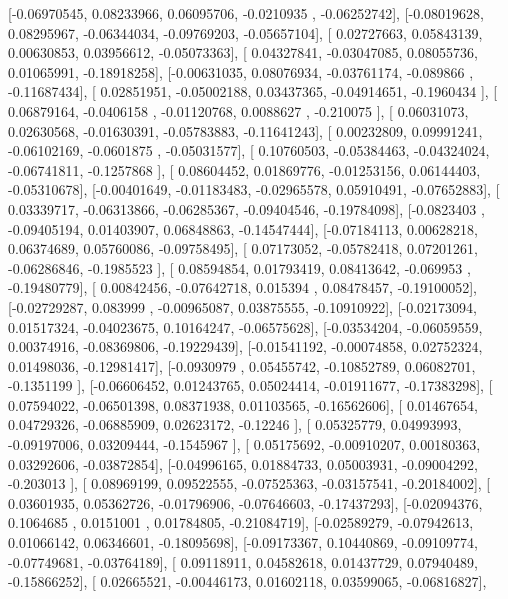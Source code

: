 \documentclass{article}
\begin{document}
       [-0.06970545,  0.08233966,  0.06095706, -0.0210935 , -0.06252742],
       [-0.08019628,  0.08295967, -0.06344034, -0.09769203, -0.05657104],
       [ 0.02727663,  0.05843139,  0.00630853,  0.03956612, -0.05073363],
       [ 0.04327841, -0.03047085,  0.08055736,  0.01065991, -0.18918258],
       [-0.00631035,  0.08076934, -0.03761174, -0.089866  , -0.11687434],
       [ 0.02851951, -0.05002188,  0.03437365, -0.04914651, -0.1960434 ],
       [ 0.06879164, -0.0406158 , -0.01120768,  0.0088627 , -0.210075  ],
       [ 0.06031073,  0.02630568, -0.01630391, -0.05783883, -0.11641243],
       [ 0.00232809,  0.09991241, -0.06102169, -0.0601875 , -0.05031577],
       [ 0.10760503, -0.05384463, -0.04324024, -0.06741811, -0.1257868 ],
       [ 0.08604452,  0.01869776, -0.01253156,  0.06144403, -0.05310678],
       [-0.00401649, -0.01183483, -0.02965578,  0.05910491, -0.07652883],
       [ 0.03339717, -0.06313866, -0.06285367, -0.09404546, -0.19784098],
       [-0.0823403 , -0.09405194,  0.01403907,  0.06848863, -0.14547444],
       [-0.07184113,  0.00628218,  0.06374689,  0.05760086, -0.09758495],
       [ 0.07173052, -0.05782418,  0.07201261, -0.06286846, -0.1985523 ],
       [ 0.08594854,  0.01793419,  0.08413642, -0.069953  , -0.19480779],
       [ 0.00842456, -0.07642718,  0.015394  ,  0.08478457, -0.19100052],
       [-0.02729287,  0.083999  , -0.00965087,  0.03875555, -0.10910922],
       [-0.02173094,  0.01517324, -0.04023675,  0.10164247, -0.06575628],
       [-0.03534204, -0.06059559,  0.00374916, -0.08369806, -0.19229439],
       [-0.01541192, -0.00074858,  0.02752324,  0.01498036, -0.12981417],
       [-0.0930979 ,  0.05455742, -0.10852789,  0.06082701, -0.1351199 ],
       [-0.06606452,  0.01243765,  0.05024414, -0.01911677, -0.17383298],
       [ 0.07594022, -0.06501398,  0.08371938,  0.01103565, -0.16562606],
       [ 0.01467654,  0.04729326, -0.06885909,  0.02623172, -0.12246   ],
       [ 0.05325779,  0.04993993, -0.09197006,  0.03209444, -0.1545967 ],
       [ 0.05175692, -0.00910207,  0.00180363,  0.03292606, -0.03872854],
       [-0.04996165,  0.01884733,  0.05003931, -0.09004292, -0.203013  ],
       [ 0.08969199,  0.09522555, -0.07525363, -0.03157541, -0.20184002],
       [ 0.03601935,  0.05362726, -0.01796906, -0.07646603, -0.17437293],
       [-0.02094376,  0.1064685 ,  0.0151001 ,  0.01784805, -0.21084719],
       [-0.02589279, -0.07942613,  0.01066142,  0.06346601, -0.18095698],
       [-0.09173367,  0.10440869, -0.09109774, -0.07749681, -0.03764189],
       [ 0.09118911,  0.04582618,  0.01437729,  0.07940489, -0.15866252],
       [ 0.02665521, -0.00446173,  0.01602118,  0.03599065, -0.06816827],
\end{document}
